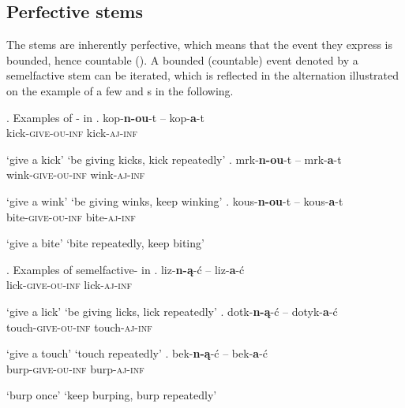 \subsection{Perfective stems}

The  stems are inherently perfective, which means that the event they express is bounded, hence countable (\citealt{Renat1979,Bach1986,deSwart1998,Willim2006,Dickey2016}). A bounded (countable) event denoted by a semelfactive stem can be iterated, which is reflected in the  alternation illustrated on the example of a few  and  s in the following. 

\ex. Examples of - in 
\ag. 
kop-\textbf{n-ou}-t -- kop-\textbf{a}-t\\
kick-\textsc{give-ou}-\textsc{inf} {} kick-\textsc{aj}-\textsc{inf}\\
\strut `give a kick' \hskip 32pt `be giving kicks, kick repeatedly'
\bg. 
mrk-\textbf{n-ou}-t -- mrk-\textbf{a}-t\\
wink-\textsc{give-ou}-\textsc{inf} {} wink-\textsc{aj}-\textsc{inf}\\
\strut `give a wink' \hskip 32pt `be giving winks, keep winking'
\cg.
kous-\textbf{n-ou}-t -- kous-\textbf{a}-t\\
bite-\textsc{give-ou}-\textsc{inf} {} bite-\textsc{aj}-\textsc{inf}\\
\strut `give a bite' \hskip 33pt `bite repeatedly, keep biting'

\ex. Examples of semelfactive- in \label{polisz}
\ag. 
liz-\textbf{n-\k{a}}-\'c -- liz-\textbf{a}-\'c\\
lick-\textsc{give-ou}-\textsc{inf} {} lick-\textsc{aj}-\textsc{inf}\\
\strut `give a lick' \hskip 32pt `be giving licks, lick repeatedly'
\bg. 
dotk-\textbf{n-\k{a}}-\'c -- dotyk-\textbf{a}-\'c\\
touch-\textsc{give-ou}-\textsc{inf} {} touch-\textsc{aj}-\textsc{inf}\\
\strut `give a touch' \hskip 33pt `touch repeatedly'
\cg.
bek-\textbf{n-\k{a}}-\'c -- bek-\textbf{a}-\'c\\
burp-\textsc{give-ou}-\textsc{inf} {} burp-\textsc{aj}-\textsc{inf}\\
\strut `burp once' \hskip 38pt `keep burping, burp repeatedly'



